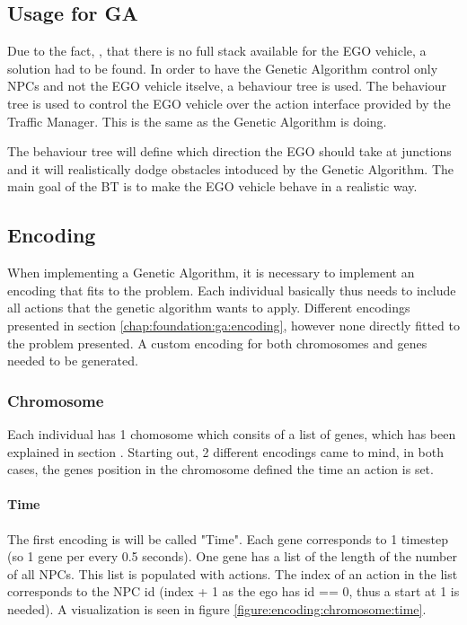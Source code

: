 \subsection{Usage for GA}
Due to the fact, , that there is no full stack available for the EGO vehicle, a solution had to be found.
In order to have the Genetic Algorithm control only NPCs and not the EGO vehicle itselve, a behaviour tree is used.
The behaviour tree is used to control the EGO vehicle over the action interface provided by the Traffic Manager. This is the same as the Genetic Algorithm is doing.

The behaviour tree will define which direction the EGO should take at junctions and it will realistically dodge obstacles intoduced by the Genetic Algorithm. The main goal of the BT is to make the EGO vehicle behave in a realistic way.


\subsection{Encoding}
When implementing a Genetic Algorithm, it is necessary to implement an encoding that fits to the problem. Each individual basically thus needs to include all actions that the genetic algorithm wants to apply. Different encodings presented in section \ref{chap:foundation:ga:encoding}, however none directly fitted to the problem presented. A custom encoding for both chromosomes and genes needed to be generated.

\subsubsection{Chromosome}
Each individual has 1 chomosome which consits of a list of genes, which has been explained in section . Starting out, 2 different encodings came to mind, in both cases, the genes position in the chromosome defined the time an action is set.

\paragraph{Time}
The first encoding is will be called "Time". Each gene corresponds to 1 timestep (so 1 gene per every 0.5 seconds). One gene has a list of the length of the number of all NPCs. This list is populated with actions. The index of an action in the list corresponds to the NPC id (index + 1 as the ego has id == 0, thus a start at 1 is needed). A visualization is seen in figure \ref{figure:encoding:chromosome:time}.

